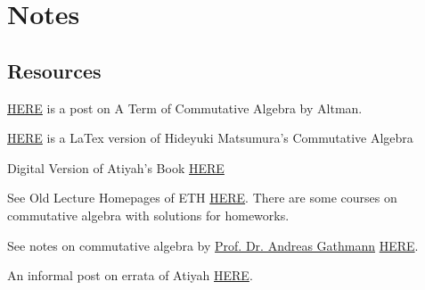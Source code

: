 \section{Notes}

\subsection{Resources}


\href{https://mathoverflow.net/questions/385312/latest-a-term-of-commutative-algebra-by-altman-and-kleiman}{HERE} is a post on A Term of Commutative Algebra by Altman.

\href{https://aareyanmanzoor.github.io/assets/matsumura-CA.pdf}{HERE} is a LaTex version of Hideyuki Matsumura's Commutative Algebra

Digital Version of Atiyah's Book \href{https://digitalcommons.unl.edu/cgi/viewcontent.cgi?article=1004&context=mathclass}{HERE}

See Old Lecture Homepages of ETH \href{https://www2.math.ethz.ch/education/bachelor/lectures.html}{HERE}. There are some courses on commutative algebra with solutions for homeworks.

See notes on commutative algebra by \href{https://math.rptu.de/en/wgs/agag/people/head/gathmann/}{Prof. Dr. Andreas Gathmann} \href{https://agag-gathmann.math.rptu.de/en/commalg.php}{HERE}.

An informal post on errata of Atiyah \href{https://mathoverflow.net/questions/42241/errata-for-atiyah-macdonald}{HERE}.

